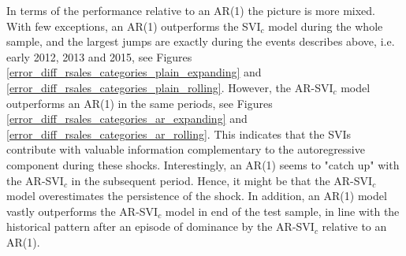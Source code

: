 In terms of the performance relative to an AR(1) the picture is more mixed. With few exceptions, an AR(1) outperforms the SVI$_c$ model during the whole sample, and the largest jumps are exactly during the events describes above, i.e. early 2012, 2013 and 2015, see Figures \ref{error_diff_rsales_categories_plain_expanding} and \ref{error_diff_rsales_categories_plain_rolling}. However, the AR-SVI$_c$ model outperforms an AR(1) in the same periods, see Figures \ref{error_diff_rsales_categories_ar_expanding} and \ref{error_diff_rsales_categories_ar_rolling}. This indicates that the SVIs contribute with valuable information complementary to the autoregressive component during these shocks. Interestingly, an AR(1) seems to "catch up" with the AR-SVI$_c$ in the subsequent period. Hence, it might be that the AR-SVI$_c$ model overestimates the persistence of the shock. In addition, an AR(1) model vastly outperforms the AR-SVI$_c$ model in end of the test sample, in line with the historical pattern after an episode of dominance by the AR-SVI$_c$ relative to an AR(1).

